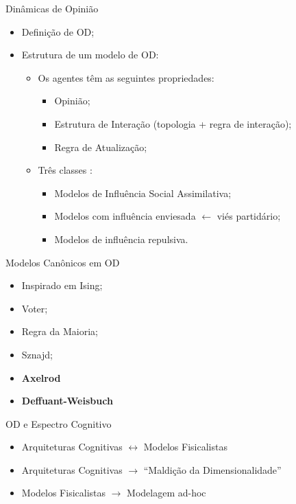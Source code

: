 \documentclass{beamer}
\begin{document}
\begin{frame}{Dinâmicas de Opinião}
  \begin{itemize}
  \item Definição de OD;
  
  \item Estrutura de um modelo de OD:
    \begin{itemize}
    \item Os agentes têm as seguintes propriedades:

      \begin{itemize}
      \item Opinião;
      \item Estrutura de Interação (topologia + regra de interação);
      \item Regra de Atualização;
      \end{itemize}
    \item Três classes \cite{flache2017}:
      \begin{itemize}
      \item Modelos de Influência Social Assimilativa;
      \item Modelos com influência enviesada  \(\leftarrow\) viés partidário;
      \item Modelos de influência repulsiva.
      \end{itemize}
      
    \end{itemize}
  \end{itemize}
\end{frame}

\begin{frame}{Modelos Canônicos em OD}
  \begin{itemize}
  \item Inspirado em Ising;
  \item Voter;
  \item Regra da Maioria;
  \item Sznajd;
  \item \textbf{Axelrod}
  \item \textbf{Deffuant-Weisbuch}
  \end{itemize}
\end{frame}

\begin{frame}{OD e Espectro Cognitivo }
  \begin{itemize}
  \item Arquiteturas Cognitivas \(\longleftrightarrow\) Modelos Fisicalistas
  \item Arquiteturas Cognitivas \(\rightarrow\) ``Maldição da Dimensionalidade''
    \cite{de2005computational}
  \item Modelos Fisicalistas \(\rightarrow\) Modelagem ad-hoc
  \end{itemize}
\end{frame}
\end{document}
